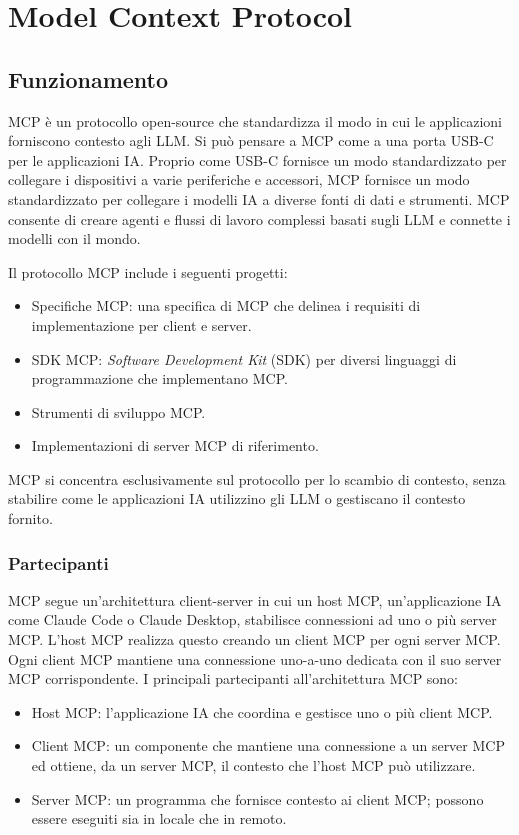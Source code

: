 \chapter{Model Context Protocol}

\section{Funzionamento}

MCP è un protocollo open-source che standardizza il modo in cui le applicazioni forniscono contesto agli LLM. Si può pensare a MCP come a una porta USB-C per le applicazioni IA. Proprio come USB-C fornisce un modo standardizzato per collegare i dispositivi a varie periferiche e accessori, MCP fornisce un modo standardizzato per collegare i modelli IA a diverse fonti di dati e strumenti. MCP consente di creare agenti e flussi di lavoro complessi basati sugli LLM e connette i modelli con il mondo. 
\cite{modelcontextprotocol2024intro}

Il protocollo MCP include i seguenti progetti:
\begin{itemize}
\item Specifiche MCP: una specifica di MCP che delinea i requisiti di implementazione per client e server.
\item SDK MCP: \textit{Software Development Kit} (SDK) per diversi linguaggi di programmazione che implementano MCP.
\item Strumenti di sviluppo MCP.
\item Implementazioni di server MCP di riferimento.
\end{itemize}
MCP si concentra esclusivamente sul protocollo per lo scambio di contesto, senza stabilire come le applicazioni IA utilizzino gli LLM o gestiscano il contesto fornito.
\cite{modelcontextprotocol2024arch}

\subsection{Partecipanti}
MCP segue un'architettura client-server in cui un host MCP, un'applicazione IA come Claude Code o Claude Desktop, stabilisce connessioni ad uno o più server MCP. L'host MCP realizza questo creando un client MCP per ogni server MCP. Ogni client MCP mantiene una connessione uno-a-uno dedicata con il suo server MCP corrispondente.
I principali partecipanti all'architettura MCP sono:
\begin{itemize}
\item Host MCP: l'applicazione IA che coordina e gestisce uno o più client MCP.
\item Client MCP: un componente che mantiene una connessione a un server MCP ed ottiene, da un server MCP, il contesto che l'host MCP può utilizzare.
\item Server MCP: un programma che fornisce contesto ai client MCP; possono essere eseguiti sia in locale che in remoto.
\cite{modelcontextprotocol2024arch}
\end{itemize}


